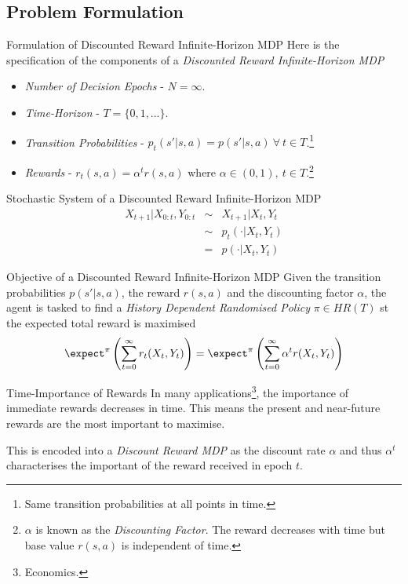 \documentclass[11pt,a4paper]{article}
\begin{document}
\subsection*{Problem Formulation}

  \begin{definition}{Formulation of Discounted Reward Infinite-Horizon MDP}
    Here is the specification of the components of a \textit{Discounted Reward Infinite-Horizon MDP}
    \begin{itemize}
      \item \textit{Number of Decision Epochs} - $N=\infty$.
      \item \textit{Time-Horizon} - $T=\{0,1,\dots\}$.
      \item \textit{Transition Probabilities} - $p_t(s'|s,a)=p(s'|s,a)\ \forall\ t\in T$.\footnote{Same transition probabilities at all points in time.}
      \item \textit{Rewards} - $r_t(s,a)=\alpha^tr(s,a)$ where $\alpha\in(0,1),\ t\in T$.\footnote{$\alpha$ is known as the \textit{Discounting Factor}. The reward decreases with time but base value $r(s,a)$ is independent of time.}
    \end{itemize}
  \end{definition}

  \begin{definition}{Stochastic System of a Discounted Reward Infinite-Horizon MDP}
    \[\begin{array}{rcl}
      X_{t+1}|X_{0:t},Y_{0:t}&\sim&X_{t+1}|X_t,Y_t\\
      &\sim&p_t(\cdot|X_t,Y_t)\\
      &=&p(\cdot|X_t,Y_t)
    \end{array}\]
  \end{definition}

  \begin{definition}{Objective of a Discounted Reward Infinite-Horizon MDP}
    Given the transition probabilities $p(s'|s,a)$, the reward $r(s,a)$ and the discounting factor $\alpha$, the agent is tasked to find a \textit{History Dependent Randomised Policy} $\pi\in HR(T)$ st the expected total reward is maximised
    \[ \expect^\pi\left(\sum_{t=0}^\infty r_t(X_t,Y_t)\right)=\expect^\pi\left(\sum_{t=0}^\infty\alpha^tr(X_t,Y_t)\right) \]
  \end{definition}

  \begin{remark}{Time-Importance of Rewards}
    In many applications\footnote{Economics.}, the importance of immediate rewards decreases in time. This means the present and near-future rewards are the most important to maximise.
    \par This is encoded into a \textit{Discount Reward MDP} as the discount rate $\alpha$ and thus $\alpha^t$ characterises the important of the reward received in epoch $t$.
  \end{remark}
\end{document}
